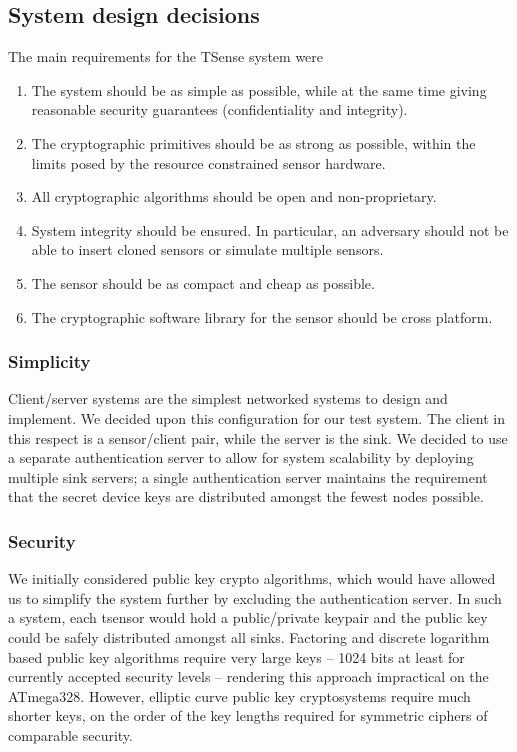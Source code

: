\subsection{System design decisions}

The main requirements for the TSense system were
%
\begin{enumerate}
\item The system should be as simple as possible, while at the same time giving reasonable security guarantees (confidentiality and integrity).
\item The cryptographic primitives should be as strong as possible, within the limits posed by the resource constrained sensor hardware.
\item All cryptographic algorithms should be open and non-proprietary.
\item System integrity should be ensured. In particular, an adversary should not be able to insert cloned sensors or simulate multiple sensors. 
\item The sensor should be as compact and cheap as possible.
\item The cryptographic software library for the sensor should be cross platform.
\end{enumerate}

\subsubsection{Simplicity}

Client/server systems are the simplest networked systems to design and implement. We decided upon this configuration for our test system. The client in this respect is a sensor/client pair, while the server is the sink. We decided to use a separate authentication server to allow for system scalability by deploying multiple sink servers; a single authentication server maintains the requirement that the secret device keys are distributed amongst the fewest nodes possible.

\subsubsection{Security}

We initially considered public key crypto algorithms, which would have allowed us to simplify the system further by excluding the authentication server. In such a system, each tsensor would hold a public/private keypair and the public key could be safely distributed amongst all sinks. Factoring and discrete logarithm based public key algorithms require very large keys -- 1024 bits at least for currently accepted security levels -- rendering this approach impractical on the ATmega328. 
%
%
However, elliptic curve public key cryptosystems \cite{koblitz1987,hankerson2004} require much shorter keys, on the order of the key lengths required for symmetric ciphers of comparable security.
%

